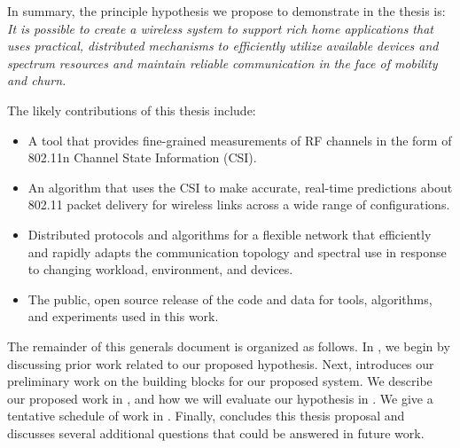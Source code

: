 
In summary, the principle hypothesis we propose to demonstrate in the thesis is: \emph{It is possible to create a wireless system to support rich home applications that uses practical, distributed mechanisms to efficiently utilize available devices and spectrum resources and maintain reliable communication in the face of mobility and churn.}

The likely contributions of this thesis include:
\begin{itemize}[leftmargin=1em,itemsep=0pt,topsep=3pt,labelsep=0.5em]
	\item A tool that provides fine-grained measurements of RF channels in the form of 802.11n Channel State Information (CSI).
	\item An algorithm that uses the CSI to make accurate, real-time predictions about 802.11 packet delivery for wireless links across a wide range of configurations.
	\item Distributed protocols and algorithms for a flexible network that efficiently and rapidly adapts the communication topology and spectral use in response to changing workload, environment, and devices.
	\item The public, open source release of the code and data for tools, algorithms, and experiments used in this work.
\end{itemize}
The remainder of this generals document is organized as follows. In , we begin by discussing prior work related to our proposed hypothesis. Next,  introduces our preliminary work on the building blocks for our proposed system. We describe our proposed work in , and how we will evaluate our hypothesis in . We give a tentative schedule of work in . Finally,  concludes this thesis proposal and discusses several additional questions that could be answered in future work.

